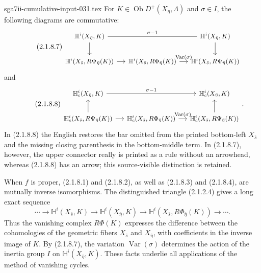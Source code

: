 \begin{filecontents*}{sga7ii-cumulative-input-031.tex}
For $K\in\operatorname{Ob}D^+(X_\eta,\Lambda)$ and $\sigma\in I$,
the following diagrams are commutative:
\begin{equation}\tag{2.1.8.7}
\begin{tikzcd}[column sep=small, cells={nodes={font=\small}}]
\mathbb H^i(X_{\bar\eta},K)
  \arrow[rr, dash, "\sigma-1"] \arrow[d]
  & {} & \mathbb H^i(X_{\bar\eta},K) \arrow[d] \\
\mathbb H^i(X_{\bar s},R\Psi_{\bar\eta}(K)) \arrow[r]
  & \mathbb H^i(X_{\bar s},R\Phi_{\bar\eta}(K))
      \arrow[r, "\operatorname{Var}(\sigma)"]
  & \mathbb H^i(X_{\bar s},R\Psi_{\bar\eta}(K))
\end{tikzcd}
\end{equation}
and
\begin{equation}\tag{2.1.8.8}
\begin{tikzcd}[column sep=small, cells={nodes={font=\small}}]
\mathbb H_c^i(X_{\bar\eta},K)
  \arrow[rr, "\sigma-1"]
  & {} & \mathbb H_c^i(X_{\bar\eta},K) \\
\mathbb H_c^i(X_{\bar s},R\Psi_{\bar\eta}(K)) \arrow[r] \arrow[u]
  & \mathbb H_c^i(X_{\bar s},R\Phi_{\bar\eta}(K))
      \arrow[r, "\operatorname{Var}(\sigma)"]
  & \mathbb H_c^i(X_{\bar s},R\Psi_{\bar\eta}(K)) \arrow[u]
\end{tikzcd}
.\end{equation}
In (2.1.8.8) the English restores the bar omitted from the printed
bottom-left $X_{\bar s}$ and the missing closing parenthesis in the
bottom-middle term.  In (2.1.8.7), however, the upper connector really
is printed as a rule without an arrowhead, whereas (2.1.8.8) has an
arrow; this source-visible distinction is retained.

When $f$ is proper, (2.1.8.1) and (2.1.8.2), as well as (2.1.8.3) and
(2.1.8.4), are mutually inverse isomorphisms.  The distinguished
triangle (2.1.2.4) gives a long exact sequence
\begin{equation}\tag{2.1.8.9}
\cdots\longrightarrow\mathbb H^i(X_{\bar s},K)
\longrightarrow\mathbb H^i(X_{\bar\eta},K)
\longrightarrow\mathbb H^i(X_{\bar s},R\Phi_{\bar\eta}(K))
\longrightarrow\cdots.
\end{equation}
Thus the vanishing complex $R\Phi(K)$ expresses the difference between
the cohomologies of the geometric fibers $X_{\bar s}$ and
$X_{\bar\eta}$, with coefficients in the inverse image of $K$.
By (2.1.8.7), the variation $\operatorname{Var}(\sigma)$ determines
the action of the inertia group $I$ on
$\mathbb H^i(X_{\bar\eta},K)$.  These facts underlie all applications
of the method of vanishing cycles.

\end{filecontents*}
